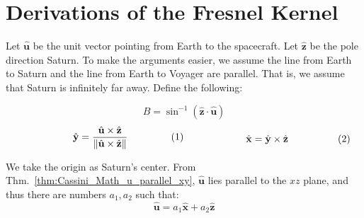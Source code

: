     \section{Derivations of the Fresnel Kernel}
            Let $\hat{\mathbf{u}}$ be the unit
            vector pointing from Earth to the spacecraft.
            Let $\hat{\mathbf{z}}$ be the pole direction
            Saturn. To make the arguments easier,
            we assume the line from Earth to Saturn
            and the line from Earth to Voyager are
            parallel. That is, we assume that
            Saturn is infinitely far away.
            Define the following:
            \par
            \begin{equation}
                \label{eqn:Cassini_Math_Def_B}
                B=\sin^{\minus{1}}
                    (\hat{\mathbf{z}}\cdot\hat{\mathbf{u}})
            \end{equation}
            \begin{subequations}
                \begin{minipage}{0.49\textwidth}
                    \begin{equation}
                        \hat{\mathbf{y}}=
                        \frac{\hat{\mathbf{u}}\times
                              \hat{\mathbf{z}}}
                             {\norm{\hat{\mathbf{u}}\times
                              \hat{\mathbf{z}}}}
                    \end{equation}
                \end{minipage}
                \hfill
                \begin{minipage}{0.49\textwidth}
                    \begin{equation}
                        \hat{\mathbf{x}}
                        =\hat{\mathbf{y}}\times
                        \hat{\mathbf{z}}
                    \end{equation}
                \end{minipage}
            \end{subequations}
            \par\hfill\par
            We take the origin as Saturn's center. From
            Thm.~\ref{thm:Cassini_Math_u_parallel_xy},
            $\hat{\mathbf{u}}$ lies parallel to the
            $xz$ plane, and thus there are numbers
            $a_{1},a_{2}$ such that:
            \begin{equation}
                \hat{\mathbf{u}}=a_{1}\hat{\mathbf{x}}+
                a_{2}\hat{\mathbf{z}}
            \end{equation}
